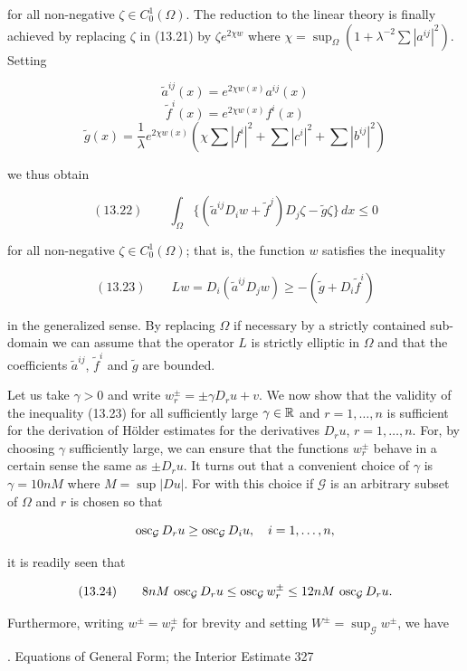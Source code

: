 for all non-negative $\zeta \in C_0^1(\Omega)$. The reduction to the linear theory is finally achieved
by replacing $\zeta$ in (13.21) by $\zeta e^{2\chi w}$ where $\chi = \sup_{\Omega} \left(1 + \lambda^{-2}\sum |a^{ij}|^2\right)$. Setting

\[
\tilde a^{ij}(x) = e^{2\chi w(x)} a^{ij}(x)
\]
\[
\tilde f^i(x) = e^{2\chi w(x)} f^i(x)
\]
\[
\tilde g(x) = \frac{1}{\lambda} e^{2\chi w(x)} \left(\chi \sum |f^i|^2 + \sum |c^i|^2 + \sum |b^{ij}|^2\right)
\]

we thus obtain

\[
(13.22)\qquad \int_{\Omega} \{(\tilde a^{ij}D_i w + \tilde f^j)D_j\zeta - \tilde g\zeta\}\, dx \leq 0
\]

for all non-negative $\zeta \in C_0^1(\Omega)$; that is, the function $w$ satisfies the inequality

\[
(13.23)\qquad Lw = D_i(\tilde a^{ij}D_j w) \geq -(\tilde g + D_i\tilde f^i)
\]

in the generalized sense. By replacing $\Omega$ if necessary by a strictly contained sub-
domain we can assume that the operator $L$ is strictly elliptic in $\Omega$ and that the
coefficients $\tilde a^{ij}$, $\tilde f^i$ and $\tilde g$ are bounded.

    Let us take $\gamma > 0$ and write $w_r^{\pm} = \pm \gamma D_r u + v$. We now show that the validity of
the inequality (13.23) for all sufficiently large $\gamma \in \mathbb{R}$ and $r = 1,\ldots,n$ is sufficient
for the derivation of H\"older estimates for the derivatives $D_r u$, $r = 1,\ldots,n$. For, by
choosing $\gamma$ sufficiently large, we can ensure that the functions $w_r^{\pm}$ behave in a
certain sense the same as $\pm D_r u$. It turns out that a convenient choice of $\gamma$ is
$\gamma = 10nM$ where $M = \sup |Du|$. For with this choice if $\mathcal{G}$ is an arbitrary subset of $\Omega$
and $r$ is chosen so that

\[
\operatorname{osc}_{\mathcal{G}} D_r u \geq \operatorname{osc}_{\mathcal{G}} D_i u, \quad i = 1,\ldots,n,
\]

it is readily seen that

\[
(13.24)\qquad 8nM\, \operatorname{osc}_{\mathcal{G}} D_r u \leq \operatorname{osc}_{\mathcal{G}} w_r^{\pm} \leq 12nM\, \operatorname{osc}_{\mathcal{G}} D_r u.
\]

Furthermore, writing $w^{\pm} = w_r^{\pm}$ for brevity and setting $W^{\pm} = \sup_{\mathcal{G}} w^{\pm}$, we have



\setcounter{section}{13}
\setcounter{subsection}{2}
. Equations of General Form; the Interior Estimate \hfill 327

